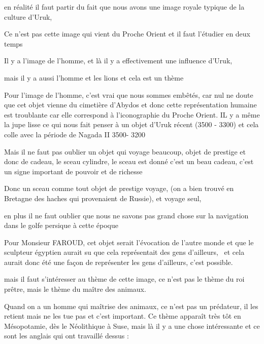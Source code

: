 \documentclass[a4paper]{article}
\begin{document}
\bigskip

{
en réalité il faut partir du fait que nous avons une image royale
typique de la culture d'Uruk, }

{
Ce n'est pas cette image qui vient du Proche Orient et il faut l'étudier
en deux temps}

{
Il y a l'image de l'homme, et là il y a effectivement une influence
d'Uruk, }

{
mais il y a aussi l'homme et les lions et cela est un thème}


\bigskip

{
Pour l'image de l'homme, c'est vrai que nous sommes embêtés, car nul ne
doute que cet objet vienne du cimetière d'Abydos et donc cette
représentation humaine est troublante car elle correspond à
l'iconographie du Proche Orient. IL y a même la jupe lisse ce qui nous
fait penser à un objet d'Uruk récent (3500 - 3300) et cela colle avec
la période de Nagada II 3500- 3200}


\bigskip


\bigskip

{
Mais il ne faut pas oublier un objet qui voyage beaucoup, objet de
prestige et donc de cadeau, le sceau cylindre, le sceau est donné c'est
un beau cadeau, c'est un signe important de pouvoir et de richesse}


\bigskip

{
Donc un sceau comme tout objet de prestige voyage, (on a bien trouvé en
Bretagne des haches qui provenaient de Russie), et voyage seul, }

{
en plus il ne faut oublier que nous ne savons pas grand chose sur la
navigation dans le golfe persique à cette époque}


\bigskip

{
Pour Monsieur FAROUD, cet objet serait l'évocation de l'autre monde et
que le sculpteur égyptien aurait su que cela représentait des gens
d'ailleurs, \ et cela aurait donc été une façon de représenter les gens
d'ailleurs, c'est possible.}


\bigskip


\bigskip

{
mais il faut s'intéresser au thème de cette image, ce n'est pas le thème
du roi prêtre, mais le thème du maître des animaux.}

{
Quand on a un homme qui maîtrise des animaux, ce n'est pas un prédateur,
il les retient mais ne les tue pas et c'est important. Ce thème
apparaît très tôt en Mésopotamie, dès le Néolithique à Suse, mais là il
y a une chose intéressante et ce sont les anglais qui ont travaillé
dessus : }
\end{document}
